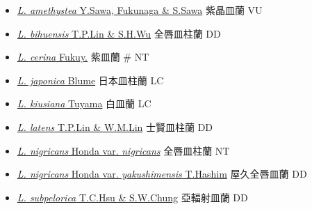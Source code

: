 \begin{itemize}
  \begin{itemize}
        \item[] \href{http://www.theplantlist.org/tpl1.1/search?q=Lecanorchis+amethystea}{\textit{L. amethystea} Y.Sawa, Fukunaga \& S.Sawa}   紫晶皿蘭   VU
        \item[] \href{http://www.theplantlist.org/tpl1.1/search?q=Lecanorchis+bihuensis}{\textit{L. bihuensis} T.P.Lin \& S.H.Wu}   全唇皿柱蘭   DD
        \item[] \href{http://www.theplantlist.org/tpl1.1/search?q=Lecanorchis+cerina}{\textit{L. cerina} Fukuy.}   紫皿蘭  \# NT
        \item[] \href{http://www.theplantlist.org/tpl1.1/search?q=Lecanorchis+japonica}{\textit{L. japonica} Blume}   日本皿柱蘭   LC
        \item[] \href{http://www.theplantlist.org/tpl1.1/search?q=Lecanorchis+kiusiana}{\textit{L. kiusiana} Tuyama}   白皿蘭   LC
        \item[] \href{http://www.theplantlist.org/tpl1.1/search?q=Lecanorchis+latens}{\textit{L. latens} T.P.Lin \& W.M.Lin}   士賢皿柱蘭   DD
        \item[] \href{http://www.theplantlist.org/tpl1.1/search?q=Lecanorchis+nigricans+var.+nigricans}{\textit{L. nigricans} Honda var. \textit{nigricans}}   全唇皿柱蘭   NT
        \item[] \href{http://www.theplantlist.org/tpl1.1/search?q=Lecanorchis+nigricans+var.+yakushimensis}{\textit{L. nigricans} Honda var. \textit{yakushimensis} T.Hashim}   屋久全唇皿蘭   DD
        \item[] \href{http://www.theplantlist.org/tpl1.1/search?q=Lecanorchis+subpelorica}{\textit{L. subpelorica} T.C.Hsu \& S.W.Chung}   亞輻射皿蘭   DD

\end{itemize}
\end{itemize}
